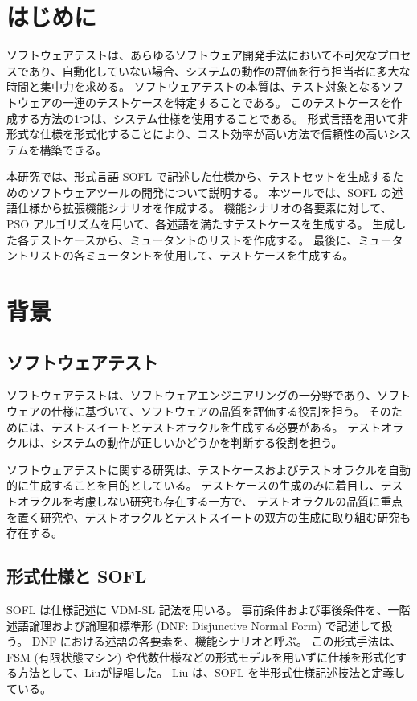\documentclass[uplatex, twocolumn, 10pt]{jsarticle} %
\begin{document}
\section{はじめに} %
ソフトウェアテストは、あらゆるソフトウェア開発手法において不可欠なプロセスであり、自動化していない場合、システムの動作の評価を行う担当者に多大な時間と集中力を求める。
ソフトウェアテストの本質は、テスト対象となるソフトウェアの一連のテストケースを特定することである。
このテストケースを作成する方法の1つは、システム仕様を使用することである。
形式言語を用いて非形式な仕様を形式化することにより、コスト効率が高い方法で信頼性の高いシステムを構築できる。

本研究では、形式言語 SOFL で記述した仕様から、テストセットを生成するためのソフトウェアツールの開発について説明する。
本ツールでは、SOFL の述語仕様から拡張機能シナリオを作成する。
機能シナリオの各要素に対して、PSO アルゴリズムを用いて、各述語を満たすテストケースを生成する。
生成した各テストケースから、ミュータントのリストを作成する。
最後に、ミュータントリストの各ミュータントを使用して、テストケースを生成する。

\section{背景}
\label{sec:background}
\subsection{ソフトウェアテスト}
ソフトウェアテストは、ソフトウェアエンジニアリングの一分野であり、ソフトウェアの仕様に基づいて、ソフトウェアの品質を評価する役割を担う。
そのためには、テストスイートとテストオラクルを生成する必要がある。
テストオラクルは、システムの動作が正しいかどうかを判断する役割を担う。

ソフトウェアテストに関する研究は、テストケースおよびテストオラクルを自動的に生成することを目的としている。
テストケースの生成のみに着目し、テストオラクルを考慮しない研究も存在する一方で、
テストオラクルの品質に重点を置く研究や、テストオラクルとテストスイートの双方の生成に取り組む研究も存在する。

\subsection{形式仕様と SOFL}
SOFL は仕様記述に VDM-SL 記法を用いる。
事前条件および事後条件を、一階述語論理および論理和標準形 (DNF: Disjunctive Normal Form) で記述して扱う。
DNF における述語の各要素を、機能シナリオと呼ぶ。
この形式手法は、FSM (有限状態マシン) や代数仕様などの形式モデルを用いずに仕様を形式化する方法として、Liuが提唱した\cite{5}。
Liu は、SOFL を半形式仕様記述技法と定義している\cite{6}。
\end{document}
